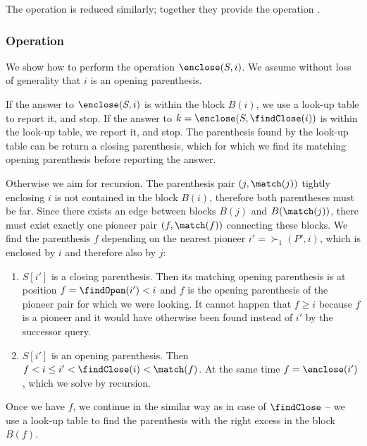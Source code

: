 The operation \findOpen{} is reduced similarly; together they provide the operation \match{}.

\subsubsection{Operation \enclose}

We show how to perform the operation $\enclose(S, i)$.
We assume without loss of generality that $i$ is an opening parenthesis.

If the answer to $\enclose(S, i)$ is within the block $B(i)$, we use a look-up table to report it, and stop.
If the answer to $k = \enclose(S, \findClose(i))$ is within the look-up table, we report it, and stop.
The parenthesis found by the look-up table can be return a closing parenthesis, which for which we find its matching opening parenthesis before reporting the answer.

Otherwise we aim for recursion.
The parenthesis pair $(j, \match(j))$ tightly enclosing $i$ is not contained in the block $B(i)$, therefore both parentheses must be far.
Since there exists an edge between blocks $B(j)$ and $B(\match(j))$, there must exist exactly one pioneer pair $(f, \match(f))$ connecting these blocks.
We find the parenthesis $f$ depending on the nearest pioneer $i' = \succ_1(P', i)$, which is enclosed by $i$ and therefore also by $j$:
\begin{enumerate}
	\item $S[i']$ is a closing parenthesis.
	Then its matching opening parenthesis is at position $f = \findOpen(i') < i$ and $f$ is the opening parenthesis of the pioneer pair for which we were looking.
	It cannot happen that $f \ge i$ because $f$ is a pioneer and it would have otherwise been found instead of $i'$ by the successor query.
	\item $S[i']$ is an opening parenthesis.
	Then $f < i \le i' < \findClose(i) < \match(f)$.
	At the same time $f = \enclose(i')$, which we solve by recursion.
\end{enumerate}
Once we have $f$, we continue in the similar way as in case of $\findClose$ -- we use a look-up table to find the parenthesis with the right excess in the block $B(f)$.

